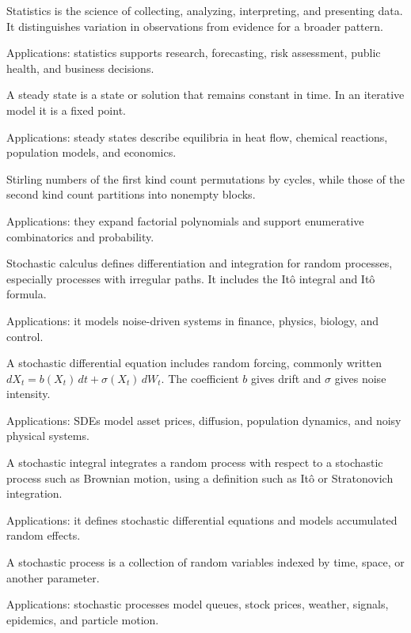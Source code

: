 Statistics is the science of collecting, analyzing, interpreting, and presenting data. It distinguishes variation in observations from evidence for a broader pattern. \par\noindent Applications: statistics supports research, forecasting, risk assessment, public health, and business decisions.

A steady state is a state or solution that remains constant in time. In an iterative model it is a fixed point. \par\noindent Applications: steady states describe equilibria in heat flow, chemical reactions, population models, and economics.

Stirling numbers of the first kind count permutations by cycles, while those of the second kind count partitions into nonempty blocks. \par\noindent Applications: they expand factorial polynomials and support enumerative combinatorics and probability.

Stochastic calculus defines differentiation and integration for random processes, especially processes with irregular paths. It includes the Itô integral and Itô formula. \par\noindent Applications: it models noise-driven systems in finance, physics, biology, and control.

A stochastic differential equation includes random forcing, commonly written $dX_t=b(X_t)\,dt+\sigma(X_t)\,dW_t$. The coefficient $b$ gives drift and $\sigma$ gives noise intensity. \par\noindent Applications: SDEs model asset prices, diffusion, population dynamics, and noisy physical systems.

A stochastic integral integrates a random process with respect to a stochastic process such as Brownian motion, using a definition such as Itô or Stratonovich integration. \par\noindent Applications: it defines stochastic differential equations and models accumulated random effects.

A stochastic process is a collection of random variables indexed by time, space, or another parameter. \par\noindent Applications: stochastic processes model queues, stock prices, weather, signals, epidemics, and particle motion.

